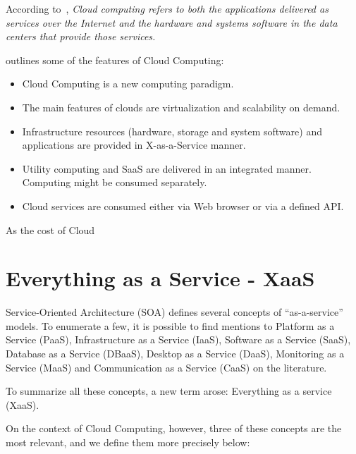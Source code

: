 According to~\cite{AViewOfCloudComputing}, \textit{Cloud computing refers to both the applications delivered as services over the Internet and the hardware and systems software in the data centers that provide those services.} 

\cite{stanoevskaslabeva2009grid} outlines some of the features of Cloud Computing:

\begin{itemize}
   \item{Cloud Computing is a new computing paradigm.}
   \item{The main features of clouds are virtualization and scalability on demand.}

   \item{Infrastructure resources (hardware, storage and system software) and applications
        are provided in X-as-a-Service manner.}
   \item{Utility computing and SaaS are delivered in an integrated manner. Computing might be consumed separately.}
   \item{Cloud services are consumed either via Web browser or via a defined API.}
\end{itemize}

As the cost of Cloud 
\section{Everything as a Service - XaaS}

Service-Oriented Architecture (SOA) defines several concepts of ``as-a-service'' models. To enumerate a few, it is possible to find mentions to Platform as a Service (PaaS), Infrastructure as a Service (IaaS), Software as a Service (SaaS), Database as a Service (DBaaS), Desktop as a Service (DaaS), Monitoring as a Service (MaaS) and Communication as a Service (CaaS) on the literature. 

To summarize all these concepts, a new term arose: Everything as a service (XaaS)\cite{7214098}\cite{Armbrust09m.:above}.

On the context of Cloud Computing, however, three of these concepts are the most relevant, and we define them more precisely below:

